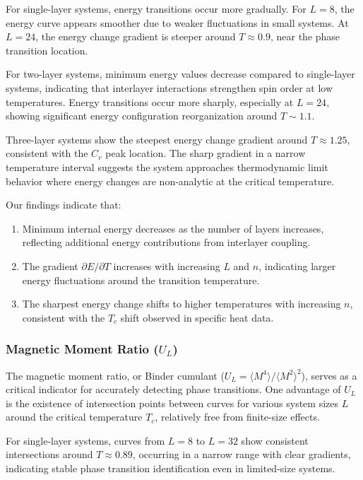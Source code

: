\documentclass[conference, compsoc, twoside]{IEEEtran}
\begin{document}
For single-layer systems, energy transitions occur more gradually. For $L = 8$, the energy curve appears smoother due to weaker fluctuations in small systems. At $L = 24$, the energy change gradient is steeper around $T \approx 0.9$, near the phase transition location.

For two-layer systems, minimum energy values decrease compared to single-layer systems, indicating that interlayer interactions strengthen spin order at low temperatures. Energy transitions occur more sharply, especially at $L = 24$, showing significant energy configuration reorganization around $T \sim 1.1$.

Three-layer systems show the steepest energy change gradient around $T \approx 1.25$, consistent with the $C_v$ peak location. The sharp gradient in a narrow temperature interval suggests the system approaches thermodynamic limit behavior where energy changes are non-analytic at the critical temperature.

Our findings indicate that:
\begin{enumerate}
\item Minimum internal energy decreases as the number of layers increases, reflecting additional energy contributions from interlayer coupling.
\item The gradient $\partial E/\partial T$ increases with increasing $L$ and $n$, indicating larger energy fluctuations around the transition temperature.
\item The sharpest energy change shifts to higher temperatures with increasing $n$, consistent with the $T_c$ shift observed in specific heat data.
\end{enumerate}

\subsubsection{Magnetic Moment Ratio ($U_L$)}

The magnetic moment ratio, or Binder cumulant ($U_L = \langle M^4 \rangle/\langle M^2 \rangle^2$), serves as a critical indicator for accurately detecting phase transitions. One advantage of $U_L$ is the existence of intersection points between curves for various system sizes $L$ around the critical temperature $T_c$, relatively free from finite-size effects.

For single-layer systems, curves from $L = 8$ to $L = 32$ show consistent intersections around $T \approx 0.89$, occurring in a narrow range with clear gradients, indicating stable phase transition identification even in limited-size systems.
\end{document}
